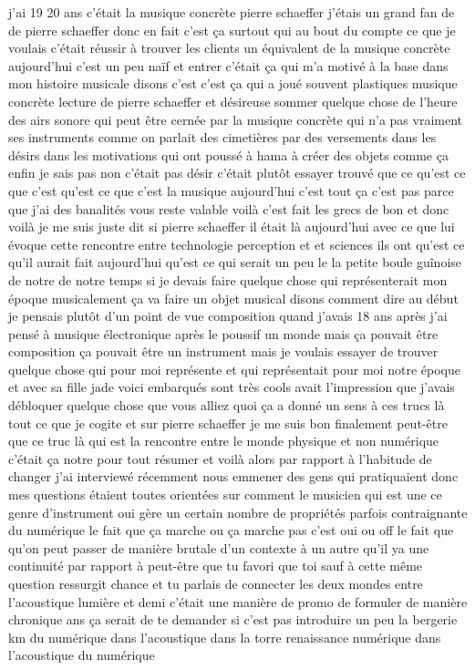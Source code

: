 j'ai 19 20 ans c'était la musique concrète pierre schaeffer j'étais un grand fan de de pierre schaeffer donc en fait c'est ça surtout qui au bout du compte ce que je voulais c'était réussir à trouver les clients un équivalent de la musique concrète aujourd'hui c'est un peu naïf et entrer c'était ça qui m'a motivé à la base dans mon histoire musicale disons c'est c'est ça qui a joué souvent plastiques musique concrète lecture de pierre schaeffer et désireuse sommer quelque chose de l'heure des airs sonore qui peut être cernée par la musique concrète qui n'a pas vraiment ses instruments comme on parlait des cimetières par des versements dans les désirs dans les motivations qui ont poussé à hama à créer des objets comme ça enfin je sais pas non c'était pas désir c'était plutôt essayer trouvé que ce qu'est ce que c'est qu'est ce que c'est 
la musique aujourd'hui c'est tout ça c'est pas parce que j'ai des banalités vous reste valable voilà c'est fait les grecs de bon et donc voilà je me suis juste dit si pierre schaeffer il était là aujourd'hui avec ce que lui évoque cette rencontre entre technologie perception et et sciences ils ont qu'est ce qu'il aurait fait aujourd'hui qu'est ce qui serait un peu le la petite boule guînoise de notre de notre temps si je devais faire quelque chose qui représenterait mon époque musicalement ça va faire un objet musical disons comment dire au début je pensais plutôt d'un point de vue composition quand j'avais 18 ans après j'ai pensé à musique électronique après le poussif un monde mais ça pouvait être composition ça pouvait être un instrument mais je voulais essayer de trouver quelque chose qui pour moi représente et qui représentait pour moi notre époque et avec sa fille jade voici embarqués sont très cools avait l'impression que j'avais débloquer quelque chose que vous 
alliez quoi ça a donné un sens à ces trucs là tout ce que je cogite et sur pierre schaeffer je me suis bon finalement peut-être que ce truc là qui est la rencontre entre le monde physique et non numérique c'était ça notre pour tout résumer et voilà alors par rapport à l'habitude de changer j'ai interviewé récemment nous emmener des gens qui pratiquaient donc mes questions étaient toutes orientées sur comment le musicien qui est une ce genre d'instrument oui gère un certain nombre de propriétés parfois contraignante du numérique le fait que ça marche ou ça marche pas c'est oui ou off le fait que qu'on peut passer de manière brutale d'un contexte à un autre qu'il ya une continuité par rapport à peut-être que tu favori que toi sauf à cette même question ressurgit chance et tu parlais de connecter les deux mondes entre l'acoustique lumière et demi c'était une manière de promo de formuler de manière chronique ans ça serait de te demander si c'est pas introduire un peu la bergerie km du numérique dans l'acoustique dans la torre renaissance numérique dans l'acoustique du numérique 
